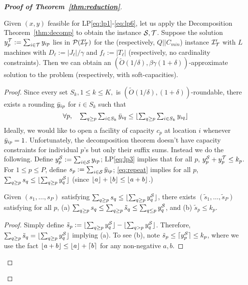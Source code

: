 \begin{proof}[{\bf Proof of Theorem~\ref{thm:reduction}}]
\begin{lemma}
	Given $(x,y)$ feasible for  LP\eqref{eq:lp1}-\eqref{eq:lp6}, let us apply the Decomposition Theorem~\ref{thm:decomp} to obtain the instance ${\cal S},{\cal T}$.
	Suppose the solution $y^{\cal T}_p := \sum_{i\in{\cal T}} y_{ip}$ lies in ${\cal P}({\cal I}'_{\cal T})$ for the \cckp (respectively, $Q||C_{min}$) instance ${\cal I}'_{\cal T}$ with $L$ machines with $D_\ell := |J_\ell|/\gamma$
	and $f_\ell := |T_\ell|$ (respectively, no cardinality constraints). Then we can obtain an $(\tilde{O}(1/\delta), \beta\gamma(1+\delta))$-approximate solution to the \mckc problem (respectively, with soft-capacities).
\end{lemma}
\begin{proof}
Since every set $S_k, 1\leq k\leq K,$ is $(\tilde{O}(1/\delta),(1+\delta))$-roundable, there exists a rounding $\bar{y}_{ip}$ for $i\in S_k$  such that
\begin{equation}\label{eq:repeat}
\textstyle \forall p, ~~~ \sum_{q\geq p} \sum_{i\in S_k} \bar{y}_{iq} \leq \lfloor\sum_{q\geq p} \sum_{i\in S_k} y_{iq}\rfloor 
\end{equation}
\def\s{\tilde{s}}
Ideally, we would like to open a facility of capacity $c_p$ at location $i$ whenever $\bar{y}_{ip} = 1$. Unfortunately, the decomposition theorem doesn't have capacity constraints for individual $p$'s but only their suffix sums. Instead we do the following. Define $y^{{\cal S}}_p := \sum_{i\in {\cal S}} y_{ip}$; LP\eqref{eq:lp3} implies that for all $p$, $y^{\cal S}_p + y^{\cal T}_p \leq k_p$.
For $1\leq p\leq P$, define $s_p := \sum_{i\in {\cal S}} \bar{y}_{ip}$; \eqref{eq:repeat} implies for all $p$, $\sum_{q\geq p} s_q \leq \lfloor\sum_{q\geq p} y^{\cal S}_q\rfloor$ (since $\lfloor a\rfloor + \lfloor b\rfloor \leq \lfloor a+b\rfloor$.)
\begin{claim}\label{clm:massmovement}
	Given $(s_1,\ldots,s_P)$ satisfying $\sum_{q\geq p} s_q \leq \lfloor\sum_{q\geq p} y^{\cal S}_q\rfloor$, there exists $(\s_1,\ldots,\s_P)$ satisfying
	for all $p$, (a) $\sum_{q\geq p} s_q \leq \sum_{q\geq p} \s_q \leq \sum_{q\leq p} y^\calS_q$, and (b) $\s_p \leq k_p$.
\end{claim}
\begin{proof}
Simply define $\s_p := \floor{\sum_{q\geq p} y^\calS_q} - \floor{\sum_{q> p} y^\calS_q}$. Therefore, $\sum_{q\geq p} \s_q = \floor{\sum_{q\geq p} y^\calS_q}$ implying (a).
To see (b), note $\s_p \leq \ceil{y^\calS_p} \leq k_p$, where we use the fact $\lfloor a+b\rfloor \leq \lfloor a\rfloor + \lceil b\rceil$ for any non-negative $a,b$.
\end{proof}


\end{proof}
\end{proof}

